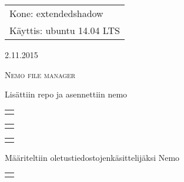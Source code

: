 \documentclass[a4paper, 12pt, twoside]{artikel3}
\def\[{\quad\begin{tabular}{l}\rowcolor{BurntOrange!30}\verb}
\def\]{\end{tabular}}
\begin{document}
\thispagestyle{empty}
\begin{tabular}[t]{l}
Kone: extendedshadow\\
Käyttis: ubuntu 14.04 LTS
\end{tabular}
\hfill 2.11.2015

{\scshape\Large{Nemo file manager}}

Lisättiin repo ja asennettiin nemo

\[
sudo apt-add-reposity ppa:noobslab/mint
\]

\[
sudo apt-get update
\]

\[
sudo apt-get install nemo
\]

Määriteltiin oletustiedostojenkäsittelijäksi Nemo

\[
xdg-mime default nemo.desktop inode/directory application/x-gnome-saved-search
\]
\end{document}
